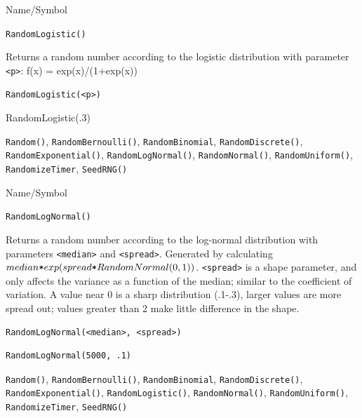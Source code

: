 \begin{desc}{Name/Symbol}
\item[Name/Symbol]	\verb+RandomLogistic()+  

\item[Description]	Returns a random number according to the logistic distribution 
		with parameter \verb+<p>+: f(x) = exp(x)/(1+exp(x))

\item[Usage]		
\begin{verbatim}
RandomLogistic(<p>)
\end{verbatim}

\item[Example]	RandomLogistic(.3)

\item[See Also]	\verb+Random()+, \verb+RandomBernoulli()+, \verb+RandomBinomial+, 
		\verb+RandomDiscrete()+, \verb+RandomExponential()+, \verb+RandomLogNormal()+, 
		\verb+RandomNormal()+, \verb+RandomUniform()+, \verb+RandomizeTimer+, \verb+SeedRNG()+
\end{desc}

\begin{desc}{Name/Symbol}
\item[Name/Symbol] 	\verb+RandomLogNormal()+

\item[Description]  	Returns a random number according to the log-normal 
		distribution with parameters \verb+<median>+ and \verb+<spread>+. Generated 
		by calculating $median \verb!*! exp(spread \verb!*! RandomNormal(0,1))$. 
		\verb+<spread>+ is a shape parameter, and only affects the variance 
		as a function of the median; similar to the coefficient of 
		variation.  A value near 0 is a sharp distribution (.1-.3), 
		larger values are more spread out; values greater than 2 make 
		little difference in the shape.

\item[Usage]
\begin{verbatim}
RandomLogNormal(<median>, <spread>)
\end{verbatim}

\item[Example]      	
\begin{verbatim}
RandomLogNormal(5000, .1)
\end{verbatim}

\item[See Also]	\verb+Random()+, \verb+RandomBernoulli()+, \verb+RandomBinomial+, 
		\verb+RandomDiscrete()+, \verb+RandomExponential()+, \verb+RandomLogistic()+,
		\verb+RandomNormal()+, \verb+RandomUniform()+, \verb+RandomizeTimer+, \verb+SeedRNG()+
\end{desc}

